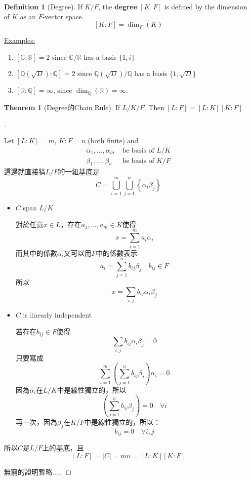 \documentclass{article}
\theoremstyle{definition}
\newtheorem{thm}{Theorem}
\newcommand{\ex}{\noindent\underline{Examples:}}
\newtheorem{dfn}{Definition}
\newenvironment{proofs}[1][\proofname]{%
  \begin{proof}[#1]$ $\par\nobreak\ignorespaces
}{%
  \end{proof}
}
\newcommand{\CC}{\mathbb C}
\newcommand{\QQ}{\mathbb Q}
\newcommand{\RR}{\mathbb R}
\begin{document}
\begin{dfn}[Degree]
	If $K/F$, the \textbf{degree} $[K:F]$ is defined by the dimension of $K$ as an $F$-vector space.
	\[ [K:F]=\dim_F(K) \]
\end{dfn}

\ex

\begin{enumerate}
	\item $[\CC: \RR]=2$ since $\CC /\RR $ has a basis $\{1,i\}$
	\item $[\QQ(\sqrt{D}):\QQ]=2$ since $\QQ(\sqrt{D})/\QQ$ has a basis $\{1,\sqrt{D}\}$
	\item $[\RR:\QQ]=\infty$, since $\dim_\QQ(\RR)=\infty$.
\end{enumerate}

\begin{thm}[Degree的Chain Rule]
	If $L/K/F$. Then $[L:F]=[L:K][K:F]$
\end{thm}

\begin{proofs}
	Let $[L:K]=m$, $K:F=n$ (both finite) and
	\begin{align*}
		\alpha_1,\dots,\alpha_m & \text{ be basis of } L/K \\
		\beta_1,\dots, \beta_n  & \text{ be basis of } K/F
	\end{align*}
	這邊就直接猜$L/F$的一組基底是
	\[
		C=\bigcup_{i=1}^m \bigcup_{j=1}^n \left\{\alpha_i\beta_j\right\}
	\]
	\begin{itemize}
		\item $C$ span $L/K$

		      對於任意$x\in L$，存在$a_1,\dots,a_m\in K$使得
		      \[x=\sum_{i=1}^m a_i \alpha_i\]
		      而其中的係數$\alpha_i$又可以用$F$中的係數表示
		      \[a_i=\sum_{j=1}^n b_{ij}\beta_j\quad b_{ij}\in F\]
		      所以
		      \[x=\sum_{i,j} b_{ij} \boxed{\alpha_i \beta_j}\]

		\item $C$ is linearly independent

		      若存在$b_{ij}\in F$使得
		      \[\sum_{i,j} b_{ij} {\alpha_i \beta_j}=0\]
		      只要寫成
		      \[\sum_{i = 1}^{m}\left(\sum_{j = 1}^{n}b_{ij}\beta_j\right) \alpha_i = 0\]
		      因為$\alpha_i$在$L/K$中是線性獨立的，所以
		      \[\left(\sum_{j = 1}^{n}b_{ij}\beta_j\right) = 0 \quad \forall i\]
		      再一次，因為$\beta_j$在$K/F$中是線性獨立的，所以：
		      \[b_{ij} = 0 \quad \forall i,j\]
	\end{itemize}
	所以$C$是$L/F$上的基底，且
	\[[L:F]=|C|=mn=[L:K][K:F]\]

	無窮的證明暫略.....
\end{proofs}
\end{document}

